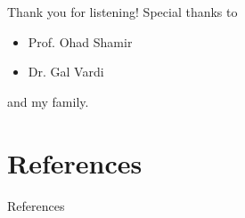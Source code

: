 \documentclass[handout,usenames,dvipsnames]{beamer} %
\begin{document}
\begin{frame}{Thank you for listening!}
Special thanks to
\begin{itemize}
    \item Prof. Ohad Shamir
    \item Dr. Gal Vardi
\end{itemize}
and my family.
\end{frame}



\section*{References}
\begin{frame}[allowframebreaks]{References}
    
        
\end{frame}
\end{document}
